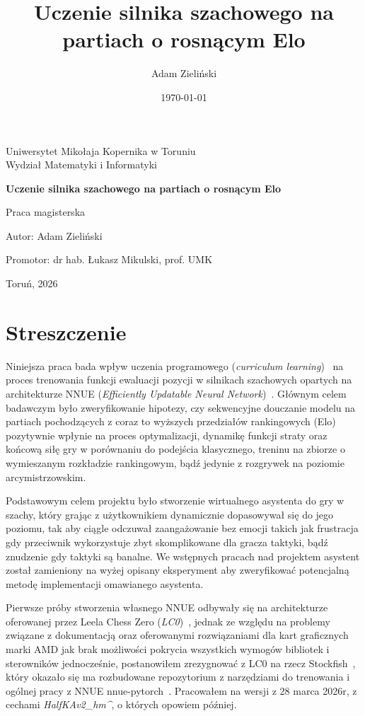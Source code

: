 \documentclass[12pt,a4paper]{report}
\title{Uczenie silnika szachowego na partiach o rosnącym Elo}
\author{Adam Zieliński}
\date{\today}
\begin{document}
\begin{titlepage}
    \centering
    \vspace*{1cm}
    {\Large Uniwersytet Mikołaja Kopernika w Toruniu\\ Wydział Matematyki i Informatyki \par}
    \vspace{3cm}
    {\Huge \textbf{Uczenie silnika szachowego na partiach o rosnącym Elo} \par}
    \vspace{2cm}
    {\Large Praca magisterska \par}
    \vspace{2cm}
    {\Large Autor: Adam Zieliński \par}
    {\Large Promotor: dr hab. Łukasz Mikulski, prof. UMK \par}
    \vfill
    {\Large Toruń, 2026 \par}
\end{titlepage}

\tableofcontents

\chapter*{Streszczenie}

Niniejsza praca bada wpływ uczenia programowego (\textit{curriculum learning})~\cite{bengio2009curriculum} na proces trenowania funkcji ewaluacji pozycji w silnikach szachowych opartych na architekturze NNUE (\textit{Efficiently Updatable Neural Network})~\cite{nasu2018nnue}. Głównym celem badawczym było zweryfikowanie hipotezy, czy sekwencyjne douczanie modelu na partiach pochodzących z coraz to wyższych przedziałów rankingowych (Elo) pozytywnie wpłynie na proces optymalizacji, dynamikę funkcji straty oraz końcową siłę gry w porównaniu do podejścia klasycznego, treninu na zbiorze o wymieszanym rozkładzie rankingowym, bądź jedynie z rozgrywek na poziomie arcymistrzowskim.

Podstawowym celem projektu było stworzenie wirtualnego asystenta do gry w szachy, który grając z użytkownikiem dynamicznie dopasowywał się do jego poziomu, tak aby ciągle odczuwał zaangażowanie bez emocji takich jak frustracja gdy przeciwnik wykorzystuje zbyt skomplikowane dla gracza taktyki, bądź znudzenie gdy taktyki są banalne. We wstępnych pracach nad projektem asystent został zamieniony na wyżej opisany eksperyment aby zweryfikować potencjalną metodę implementacji omawianego asystenta. 

Pierwsze próby stworzenia własnego NNUE odbywały się na architekturze oferowanej przez Leela Chess Zero (\textit{LC0})~\cite{lc0}, jednak ze względu na problemy związane z dokumentacją oraz oferowanymi rozwiązaniami dla kart graficznych marki AMD jak brak możliwości pokrycia wszystkich wymogów bibliotek i sterowników jednocześnie, postanowiłem zrezygnować z LC0 na rzecz Stockfish~\cite{stockfish}, który okazało się ma rozbudowane repozytorium z narzędziami do trenowania i ogólnej pracy z NNUE nnue-pytorch~\cite{nnuepytorch}. Pracowałem na wersji z 28 marca 2026r, z cechami \textit{HalfKAv2\_hm\string^}, o których opowiem później.
\end{document}
